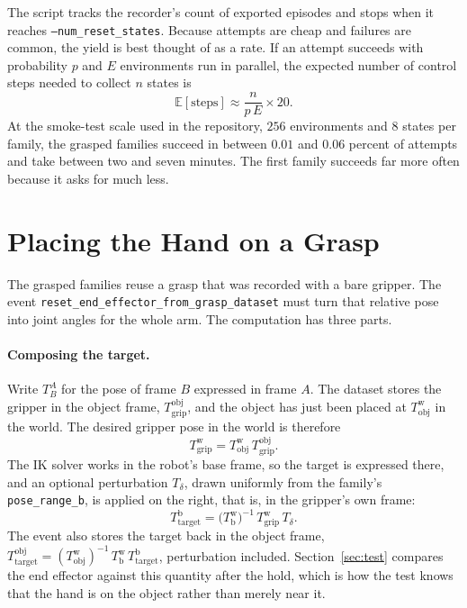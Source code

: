 \documentclass{article}
\newcommand{\E}{\mathbb{E}}
\newcommand{\Tf}[2]{T^{#1}_{#2}}
\newcommand{\w}{\mathrm{w}}
\newcommand{\obj}{\mathrm{obj}}
\newcommand{\grip}{\mathrm{grip}}
\newcommand{\base}{\mathrm{b}}
\newcommand{\tgt}{\mathrm{target}}
\newcommand{\code}[1]{\texttt{#1}}
\begin{document}
The script tracks the recorder's count of exported episodes and stops when it reaches \code{--num\_reset\_states}. Because attempts are cheap and failures are common, the yield is best thought of as a rate. If an attempt succeeds with probability $p$ and $E$ environments run in parallel, the expected number of control steps needed to collect $n$ states is
\begin{equation}
  \E[\text{steps}] \approx \frac{n}{p\,E}\times 20 .
  \label{eq:cost}
\end{equation}
At the smoke-test scale used in the repository, $256$ environments and $8$ states per family, the grasped families succeed in between $0.01$ and $0.06$ percent of attempts and take between two and seven minutes. The first family succeeds far more often because it asks for much less.

\section{Placing the Hand on a Grasp}
\label{sec:place}

The grasped families reuse a grasp that was recorded with a bare gripper. The event \code{reset\_end\_effector\_from\_grasp\_dataset} must turn that relative pose into joint angles for the whole arm. The computation has three parts.

\paragraph{Composing the target.}
Write $\Tf{A}{B}$ for the pose of frame $B$ expressed in frame $A$. The dataset stores the gripper in the object frame, $\Tf{\obj}{\grip}$, and the object has just been placed at $\Tf{\w}{\obj}$ in the world. The desired gripper pose in the world is therefore
\begin{equation}
  \Tf{\w}{\grip} = \Tf{\w}{\obj}\,\Tf{\obj}{\grip}.
\end{equation}
The IK solver works in the robot's base frame, so the target is expressed there, and an optional perturbation $T_\delta$, drawn uniformly from the family's \code{pose\_range\_b}, is applied on the right, that is, in the gripper's own frame:
\begin{equation}
  \Tf{\base}{\tgt} = \big(\Tf{\w}{\base}\big)^{-1}\,\Tf{\w}{\grip}\,T_\delta .
  \label{eq:target}
\end{equation}
The event also stores the target back in the object frame, $\Tf{\obj}{\tgt}=(\Tf{\w}{\obj})^{-1}\,\Tf{\w}{\base}\,\Tf{\base}{\tgt}$, perturbation included. Section~\ref{sec:test} compares the end effector against this quantity after the hold, which is how the test knows that the hand is on the object rather than merely near it.
\end{document}
